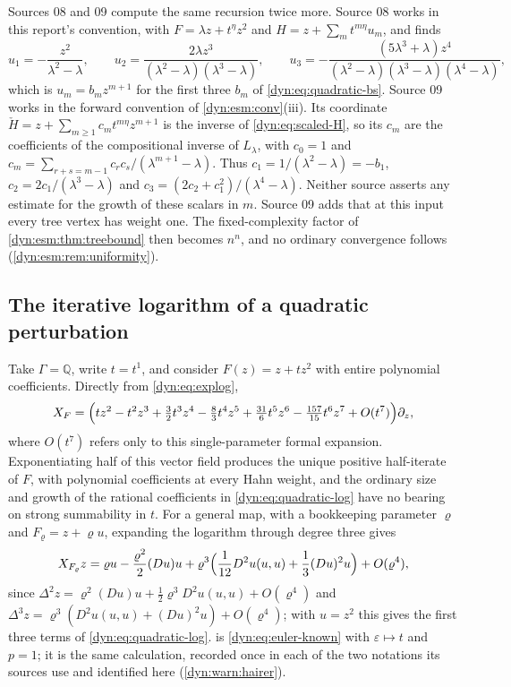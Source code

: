 \documentclass[11pt,letterpaper]{article}
\theoremstyle{definition}
\theoremstyle{remark}
\newcommand{\Q}{\mathbb Q}
\newcommand{\eps}{\varepsilon}
\numberwithin{equation}{section}
\begin{document}
Sources 08 and 09 compute the same recursion twice more. Source 08 works in
this report's convention, with $F=\lambda z+t^{\eta}z^{2}$ and
$H=z+\sum_mt^{m\eta}u_m$, and finds
\[
 u_1=-\frac{z^{2}}{\lambda^{2}-\lambda},\qquad
 u_2=\frac{2\lambda z^{3}}{(\lambda^{2}-\lambda)(\lambda^{3}-\lambda)},\qquad
 u_3=-\frac{(5\lambda^{3}+\lambda)z^{4}}
 {(\lambda^{2}-\lambda)(\lambda^{3}-\lambda)(\lambda^{4}-\lambda)},
\]
which is $u_m=b_mz^{m+1}$ for the first three $b_m$ of
\eqref{dyn:eq:quadratic-bs}. Source 09 works in the forward convention of
\cref{dyn:esm:conv}(iii). Its coordinate
$\check H=z+\sum_{m\ge1}c_mt^{m\eta}z^{m+1}$ is the inverse of
\eqref{dyn:eq:scaled-H}, so its $c_m$ are the coefficients of the
compositional inverse of $L_\lambda$, with $c_0=1$ and
$c_m=\sum_{r+s=m-1}c_rc_s/(\lambda^{m+1}-\lambda)$. Thus
$c_1=1/(\lambda^{2}-\lambda)=-b_1$, $c_2=2c_1/(\lambda^{3}-\lambda)$ and
$c_3=(2c_2+c_1^{2})/(\lambda^{4}-\lambda)$. Neither source asserts any
estimate for the growth of these scalars in $m$. Source 09 adds that at this
input every tree vertex has weight one. The fixed-complexity factor of
\cref{dyn:esm:thm:treebound} then becomes $n^{n}$, and no ordinary
convergence follows (\cref{dyn:esm:rem:uniformity}).

\subsection{The iterative logarithm of a quadratic perturbation}
\label{dyn:ex:quadlog}
Take $\Gamma=\Q$, write $t=t^{1}$, and consider $F(z)=z+tz^{2}$ with
entire polynomial coefficients. Directly from \eqref{dyn:eq:explog},
\begin{equation}\label{dyn:eq:quadratic-log}
 X_F=\Bigl(tz^{2}-t^{2}z^{3}+\tfrac32t^{3}z^{4}-\tfrac83t^{4}z^{5}
 +\tfrac{31}6t^{5}z^{6}-\tfrac{157}{15}t^{6}z^{7}+O(t^{7})\Bigr)\partial_z ,
\end{equation}
where $O(t^{7})$ refers only to this single-parameter formal expansion.
Exponentiating half of this vector field produces the unique positive
half-iterate of $F$, with polynomial coefficients at every Hahn weight, and
the ordinary size and growth of the rational coefficients in
\eqref{dyn:eq:quadratic-log} have no bearing on strong summability in $t$.
For a general map, with a bookkeeping parameter $\varrho$ and
$F_\varrho=z+\varrho u$, expanding the logarithm through degree three gives
\begin{equation}\label{dyn:eq:general-third-log}
 X_{F_\varrho}z=\varrho u-\frac{\varrho^{2}}{2}(Du)u
 +\varrho^{3}\Bigl(\frac1{12}D^{2}u(u,u)+\frac13(Du)^{2}u\Bigr)
 +O(\varrho^{4}),
\end{equation}
since $\Delta^{2}z=\varrho^{2}(Du)u+\frac12\varrho^{3}D^{2}u(u,u)+O(\varrho^{4})$
and $\Delta^{3}z=\varrho^{3}(D^{2}u(u,u)+(Du)^{2}u)+O(\varrho^{4})$; with
$u=z^{2}$ this gives the first three terms of
\eqref{dyn:eq:quadratic-log}.  is
\eqref{dyn:eq:euler-known} with $\eps\mapsto t$ and $p=1$; it is the same
calculation, recorded once in each of the two notations its sources use and
identified here (\cref{dyn:warn:hairer}).
\end{document}
